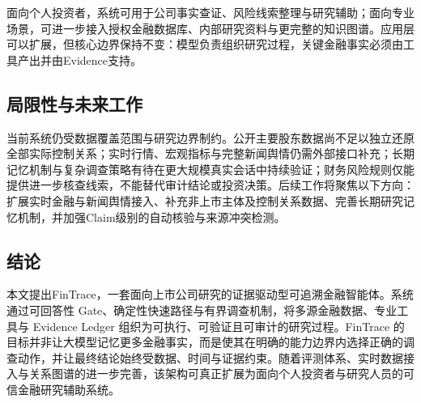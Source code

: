 面向个人投资者，系统可用于公司事实查证、风险线索整理与研究辅助；面向专业场景，可进一步接入授权金融数据库、内部研究资料与更完整的知识图谱。应用层可以扩展，但核心边界保持不变：模型负责组织研究过程，关键金融事实必须由工具产出并由Evidence支持。

\subsection{局限性与未来工作}

当前系统仍受数据覆盖范围与研究边界制约。公开主要股东数据尚不足以独立还原全部实际控制关系；实时行情、宏观指标与完整新闻舆情仍需外部接口补充；长期记忆机制与复杂调查策略有待在更大规模真实会话中持续验证；财务风险规则仅能提供进一步核查线索，不能替代审计结论或投资决策。后续工作将聚焦以下方向：扩展实时金融与新闻舆情接入、补充非上市主体及控制关系数据、完善长期研究记忆机制，并加强Claim级别的自动核验与来源冲突检测。

\subsection{结论}

本文提出FinTrace，一套面向上市公司研究的证据驱动型可追溯金融智能体。系统通过可回答性 Gate、确定性快速路径与有界调查机制，将多源金融数据、专业工具与 Evidence Ledger 组织为可执行、可验证且可审计的研究过程。FinTrace 的目标并非让大模型记忆更多金融事实，而是使其在明确的能力边界内选择正确的调查动作，并让最终结论始终受数据、时间与证据约束。随着评测体系、实时数据接入与关系图谱的进一步完善，该架构可真正扩展为面向个人投资者与研究人员的可信金融研究辅助系统。
